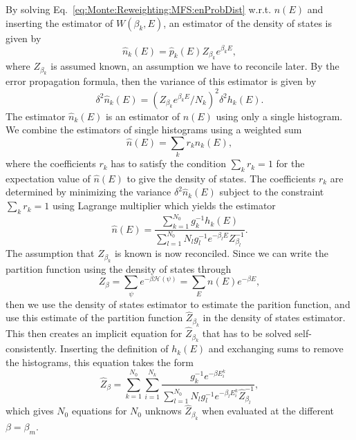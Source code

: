By solving Eq.~\eqref{eq:Monte:Reweighting:MFS:enProbDist} w.r.t. $n(E)$ and inserting the estimator of $W(\beta_k,E)$, an estimator of the density of states is given by
\begin{equation}
    \label{eq:Monte:Reweighting:MFS:DOSEstimator}
    \hat{n}_k(E) = \hat{p}_k(E)Z_{\beta_k}e^{\beta_kE},
\end{equation}
where $Z_{\beta_k}$ is assumed known, an assumption we have to reconcile later. By the error propagation formula, then the variance of this estimator is given by
\begin{equation}
    \label{eq:Monte:Reweighting:MFS:DOSVariance}
    \delta^2\hat{n}_k(E) = (Z_{\beta_k}e^{\beta_kE}/N_k)^2\delta^2h_k(E).
\end{equation}
The estimator $\hat{n}_k(E)$ is an estimator of $n(E)$ using only a single histogram. We combine the estimators of single histograms using a weighted sum
\begin{equation}
    \label{eq:Monte:Reweighting:MFS:DOSWeightedEstimator}
    \hat{n}(E) = \sum_kr_k\hat{n}_k(E),
\end{equation}
where the coefficients $r_k$ has to satisfy the condition $\sum_kr_k = 1$ for the expectation value of $\hat{n}(E)$ to give the density of states. The coefficients
$r_k$ are determined by minimizing the variance $\delta^2\hat{n}_k(E)$ subject to the constraint $\sum_kr_k=1$ using Lagrange multiplier which yields the estimator
\begin{equation}
    \label{eq:Monte:Reweighting:MFS:minimizedDOSWeightedEstimator}
    \hat{n}(E) = \frac{\sum_{k=1}^{N_0}g_k^{-1}h_k(E)}{\sum_{l=1}^{N_0}N_lg_l^{-1}e^{-\beta_lE}Z_{\beta_l}^{-1}}.
\end{equation}
The assumption that $Z_{\beta_k}$ is known is now reconciled. Since we can write the partition function using the density of states through
\begin{equation}
    \label{eq:Monte:Reweigehting:MFS:partitionFunctionDOS}
    Z_\beta = \sum_\psi e^{-\beta\mathcal{H}(\psi)} = \sum_En(E)e^{-\beta E},
\end{equation}
then we use the density of states estimator to estimate the parition function, and use this estimate of the partition function $\hat{Z}_{\beta_k}$ in the density
of states estimator. This then creates an implicit equation for $\hat{Z}_{\beta_k}$ that has to be solved self-consistently. Inserting the definition of $h_k(E)$
and exchanging sums to remove the histograms, this equation takes the form
\begin{equation}
    \label{eq:Monte:Reweighting:MFS:selfConsistencyEq}
    \hat{Z}_{\beta} = \sum_{k=1}^{N_0}\sum_{i=1}^{N_k}\frac{g_k^{-1}e^{-\beta E_i^k}}{\sum_{l=1}^{N_0}N_lg_l^{-1}e^{-\beta_lE_i^k}\hat{Z}_{\beta_l}^{-1}},
\end{equation}
which gives $N_0$ equations for $N_0$ unknows $\hat{Z}_{\beta_k}$ when evaluated at the different $\beta=\beta_m$.

